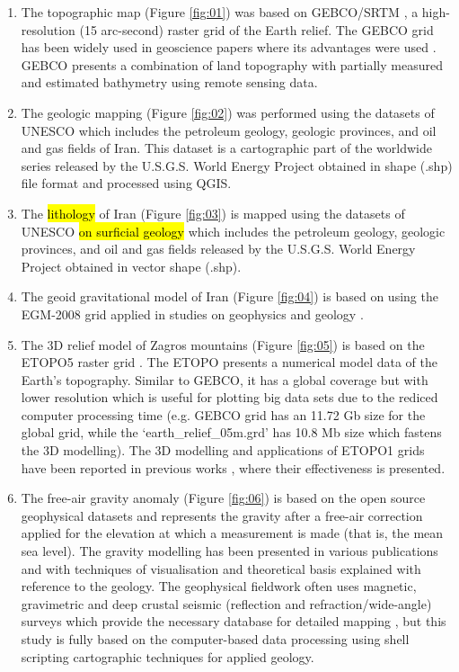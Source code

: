 \documentclass[12pt,a4paper,oneside]{article}
\begin{document}
\begin{enumerate}  
	\item The topographic map (Figure \ref{fig:01}) was based on GEBCO/SRTM \citep{GEBCO}, a high-resolution (15 arc-second) raster grid of the Earth relief. The GEBCO grid has been widely used in geoscience papers where its advantages were used \citep{Lemenkova2020c,Lemenkova2020d,Lemenkova202112,Lindh}. GEBCO presents a combination of land topography with partially measured and estimated bathymetry using remote sensing data. 
	\item The geologic mapping (Figure \ref{fig:02}) was performed using the datasets of UNESCO which includes the petroleum geology, geologic provinces, and oil and gas fields of Iran. This dataset is a cartographic part of the worldwide series released by the U.S.G.S. World Energy Project obtained in shape (.shp) file format and processed using QGIS.
	\item The \hl{lithology} of Iran (Figure \ref{fig:03}) is mapped using the datasets of UNESCO \hl{on surficial geology} which includes the petroleum geology, geologic provinces, and oil and gas fields released by the U.S.G.S. World Energy Project obtained in vector shape (.shp).
	\item The geoid gravitational model of Iran (Figure \ref{fig:04}) is based on using the EGM-2008 grid \citep{Pavlis} applied in studies on geophysics and geology \citep{Lemenkova2020h}.
	\item The 3D relief model of Zagros mountains (Figure \ref{fig:05}) is based on the ETOPO5 raster grid \citep{AmanteEakins}. The ETOPO presents a numerical model data of the Earth’s topography. Similar to GEBCO, it has a global coverage but with lower resolution which is useful for plotting big data sets due to the rediced computer processing time (e.g. GEBCO grid has an 11.72 Gb size for the global grid, while the ‘earth\_relief\_05m.grd’ has 10.8 Mb size which fastens the 3D modelling). The 3D modelling and applications of ETOPO1 grids have been reported in previous works \citep{Lemenkova2020e,Verard,Spooner,Lemenkova202017}, where their effectiveness is presented. 
	\item The free-air gravity anomaly (Figure \ref{fig:06}) is based on the open source geophysical datasets \citep{Sandwell1997,Sandwell2014} and represents the gravity after a free-air correction applied for the elevation at which a measurement is made (that is, the mean sea level). The gravity modelling has been presented in various publications \citep{Lemenkova2020i} and \citep{Djamour} with techniques of visualisation and theoretical basis explained with reference to the geology. The geophysical fieldwork often uses magnetic, gravimetric and deep crustal seismic (reflection and refraction/wide-angle) surveys which provide the necessary database for detailed mapping \citep{Lemenkova202140,Lemenkova202135,Lemenkova202127}, but this study is fully based on the computer-based data processing using shell scripting cartographic techniques for applied geology.

\end{enumerate}
\end{document}
